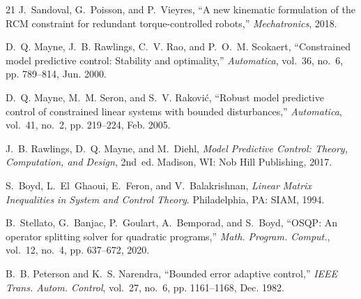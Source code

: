 \begin{thebibliography}{21}
J.~Sandoval, G.~Poisson, and P.~Vieyres, ``A new kinematic formulation of the RCM constraint for redundant torque-controlled robots,'' \emph{Mechatronics}, 2018.

D.~Q. Mayne, J.~B. Rawlings, C.~V. Rao, and P.~O.~M. Scokaert, ``Constrained model predictive control: Stability and optimality,'' \emph{Automatica}, vol.~36, no.~6, pp. 789--814, Jun. 2000.

D.~Q. Mayne, M.~M. Seron, and S.~V. Rakovi\'{c}, ``Robust model predictive control of constrained linear systems with bounded disturbances,'' \emph{Automatica}, vol.~41, no.~2, pp. 219--224, Feb. 2005.

J.~B. Rawlings, D.~Q. Mayne, and M.~Diehl, \emph{Model Predictive Control: Theory, Computation, and Design}, 2nd~ed. Madison, WI: Nob Hill Publishing, 2017.

S.~Boyd, L.~El~Ghaoui, E.~Feron, and V.~Balakrishnan, \emph{Linear Matrix Inequalities in System and Control Theory}. Philadelphia, PA: SIAM, 1994.

B.~Stellato, G.~Banjac, P.~Goulart, A.~Bemporad, and S.~Boyd, ``OSQP: An operator splitting solver for quadratic programs,'' \emph{Math. Program. Comput.}, vol.~12, no.~4, pp. 637--672, 2020.

B.~B. Peterson and K.~S. Narendra, ``Bounded error adaptive control,'' \emph{IEEE Trans. Autom. Control}, vol.~27, no.~6, pp. 1161--1168, Dec. 1982.

\end{thebibliography}
